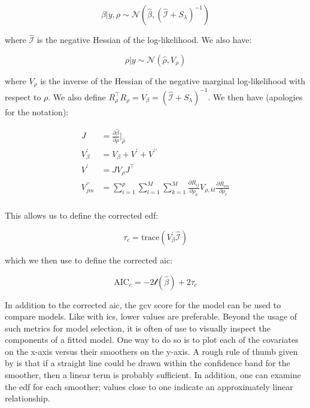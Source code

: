 \documentclass{report}
\begin{document}
\begin{equation}\label{eq:glm-gam-beta-asymptotics-bayesian}
    \beta | y, \rho \sim \mathcal{N}\left(\hat{\beta}, \left(\hat{\mathcal{I}} + S_\lambda\right)^{-1}\right)
\end{equation}

where $\hat{\mathcal{I}}$ is the negative Hessian of the log-likelihood. We also have:

\begin{equation}\label{eq:glm-gam-rho-asymptotics}
    \rho | y \sim \mathcal{N}\left(\hat{\rho}, V_\rho\right)
\end{equation}

where $V_\rho$ is the inverse of the Hessian of the negative marginal log-likelihood with respect to $\rho$. We also define $R_\rho^\intercal R_\rho = V_\beta = \left(\hat{\mathcal{I}} + S_\lambda\right)^{-1}$. We then have (apologies for the notation):

\begin{equation}\label{eq:glm-gam-vcov-matrices}
    \begin{aligned}
        J &= \frac{\partial\hat{\beta}}{\partial\rho} \bigg |_{\hat{\rho}} \\
        V^\prime_\beta &= V_\beta + V^\prime + V^{\prime\prime} \\
        V^\prime &= JV_\rho J^\intercal \\
        V^{\prime\prime}_{jm} &= \sum_{i=1}^p\sum_{l=1}^M\sum_{k=1}^M \frac{\partial R_{ij}}{\partial\rho_k} V_{\rho, kl} \frac{\partial R_{im}}{\partial\rho_l} \\
    \end{aligned}
\end{equation}

This allows us to define the corrected \gls{edf}:

\begin{equation}\label{eq:glm-gam-corrected-edf}
    \tau_c = \text{trace}\left(V_\beta^\prime \hat{\mathcal{I}}\right)
\end{equation}

which we then use to define the corrected \gls{aic}:

\begin{equation}\label{eq:glm-gam-corrected-aic}
    \text{AIC}_c = -2\mathcal{l}\left(\hat{\beta}\right) + 2\tau_c
\end{equation}

In addition to the corrected \gls{aic}, the \gls{gcv} score for the model can be used to compare models. Like with \glspl{ic}, lower values are preferable. Beyond the usage of such metrics for model selection, it is often of use to visually inspect the components of a fitted model. One way to do so is to plot each of the covariates on the x-axis versus their smoothers on the y-axis. A rough rule of thumb given by \cite[Chapter~15.2]{faraway_extending_2016} is that if a straight line could be drawn within the confidence band for the smoother, then a linear term is probably sufficient. In addition, one can examine the \gls{edf} for each smoother; values close to one indicate an approximately linear relationship. 
\end{document}
